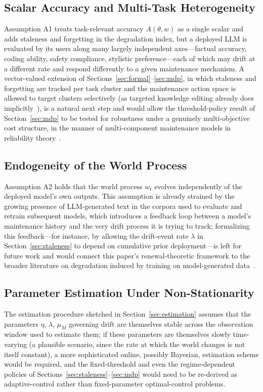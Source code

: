\documentclass[electronics,article,submit,pdftex,moreauthors]{Definitions/mdpi}
\begin{document}
\subsection{Scalar Accuracy and Multi-Task Heterogeneity}

Assumption A1 treats task-relevant accuracy $A(\theta,w)$ as a single scalar and adds staleness and forgetting in the degradation index, but a deployed LLM is evaluated by its users along many largely independent axes---factual accuracy, coding ability, safety compliance, stylistic preference---each of which may drift at a different rate and respond differently to a given maintenance mechanism. A vector-valued extension of Sections~\ref{sec:formal}--\ref{sec:mdp}, in which staleness and forgetting are tracked per task cluster and the maintenance action space is allowed to target clusters selectively (as targeted knowledge editing already does implicitly~\cite{WangS2024,Zhang2024}), is a natural next step and would allow the threshold-policy result of Section~\ref{sec:mdp} to be tested for robustness under a genuinely multi-objective cost structure, in the manner of multi-component maintenance models in reliability theory~\cite{Dekker1997}.

\subsection{Endogeneity of the World Process}

Assumption A2 holds that the world process $w_t$ evolves independently of the deployed model's own outputs. This assumption is already strained by the growing presence of LLM-generated text in the corpora used to evaluate and retrain subsequent models, which introduces a feedback loop between a model's maintenance history and the very drift process it is trying to track; formalizing this feedback---for instance, by allowing the drift-event rate $\lambda$ in Section~\ref{sec:staleness} to depend on cumulative prior deployment---is left for future work and would connect this paper's renewal-theoretic framework to the broader literature on degradation induced by training on model-generated data~\cite{Shumailov2024}.

\subsection{Parameter Estimation Under Non-Stationarity}

The estimation procedure sketched in Section~\ref{sec:estimation} assumes that the parameters $\eta$, $\lambda$, $\mu_M$ governing drift are themselves stable across the observation window used to estimate them; if these parameters are themselves slowly time-varying (a plausible scenario, since the rate at which the world changes is not itself constant), a more sophisticated online, possibly Bayesian, estimation scheme would be required, and the fixed-threshold and even the regime-dependent policies of Sections~\ref{sec:staleness}--\ref{sec:mdp} would need to be re-derived as adaptive-control rather than fixed-parameter optimal-control problems.
\end{document}
